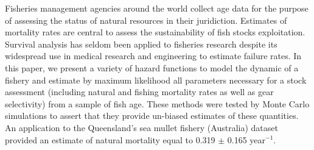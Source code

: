 Fisheries management agencies around the world collect age data for the purpose of assessing the status of natural resources in their juridiction. Estimates of mortality rates are central to assess the sustainability of fish stocks exploitation. Survival analysis has seldom been applied to fisheries research despite its widespread use in medical research and engineering to estimate failure rates. In this paper, we present a variety of hazard functions to model the dynamic of a fishery and estimate by maximum likelihood all parameters necessary for a stock assessment (including natural and fishing mortality rates as well as gear selectivity) from a sample of fish age. These methods were tested by Monte Carlo simulations to assert that they provide un-biased estimates of these quantities. An application to the Queensland's sea mullet fishery (Australia) dataset provided an estimate of natural mortality equal to 0.319 $\pm$ 0.165 year$^{-1}$.



